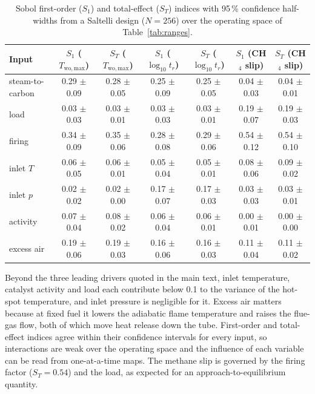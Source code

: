 \documentclass[final,3p,times]{elsarticle}
\begin{document}
\begin{table}[t]
\centering\footnotesize
\caption{Sobol first-order ($S_1$) and total-effect ($S_T$) indices with 95\,\% confidence half-widths from a Saltelli design ($N = 256$) over the operating space of Table~\ref{tab:ranges}.}
\label{tab:sobol}
\begin{tabular}{lcccccc}
\toprule
Input & $S_1$ ($T_{\mathrm{wo,max}}$) & $S_T$ ($T_{\mathrm{wo,max}}$) & $S_1$ ($\log_{10} t_r$) & $S_T$ ($\log_{10} t_r$) & $S_1$ (CH$_4$ slip) & $S_T$ (CH$_4$ slip) \\
\midrule
steam-to-carbon & 0.29 $\pm$ 0.09 & 0.28 $\pm$ 0.05 & 0.25 $\pm$ 0.09 & 0.25 $\pm$ 0.05 & 0.04 $\pm$ 0.03 & 0.04 $\pm$ 0.01 \\
load            & 0.03 $\pm$ 0.03 & 0.03 $\pm$ 0.01 & 0.03 $\pm$ 0.03 & 0.03 $\pm$ 0.01 & 0.19 $\pm$ 0.07 & 0.19 $\pm$ 0.03 \\
firing          & 0.34 $\pm$ 0.09 & 0.35 $\pm$ 0.06 & 0.28 $\pm$ 0.08 & 0.29 $\pm$ 0.06 & 0.54 $\pm$ 0.12 & 0.54 $\pm$ 0.10 \\
inlet $T$       & 0.06 $\pm$ 0.05 & 0.06 $\pm$ 0.01 & 0.05 $\pm$ 0.04 & 0.05 $\pm$ 0.01 & 0.08 $\pm$ 0.06 & 0.09 $\pm$ 0.02 \\
inlet $p$       & 0.02 $\pm$ 0.02 & 0.02 $\pm$ 0.00 & 0.17 $\pm$ 0.07 & 0.17 $\pm$ 0.03 & 0.03 $\pm$ 0.03 & 0.03 $\pm$ 0.01 \\
activity        & 0.07 $\pm$ 0.04 & 0.08 $\pm$ 0.02 & 0.06 $\pm$ 0.04 & 0.06 $\pm$ 0.01 & 0.00 $\pm$ 0.01 & 0.00 $\pm$ 0.00 \\
excess air      & 0.19 $\pm$ 0.06 & 0.19 $\pm$ 0.03 & 0.16 $\pm$ 0.06 & 0.16 $\pm$ 0.03 & 0.11 $\pm$ 0.04 & 0.11 $\pm$ 0.02 \\
\bottomrule
\end{tabular}
\end{table}

Beyond the three leading drivers quoted in the main text, inlet temperature, catalyst activity and
load each contribute below 0.1 to the variance of the hot-spot temperature, and inlet pressure is
negligible for it. Excess air matters because at fixed fuel it lowers the adiabatic flame
temperature and raises the flue-gas flow, both of which move heat release down the tube. First-order
and total-effect indices agree within their confidence intervals for every input, so interactions
are weak over the operating space and the influence of each variable can be read from one-at-a-time
maps. The methane slip is governed by the firing factor ($S_T = 0.54$) and the load, as expected for
an approach-to-equilibrium quantity.
\end{document}
